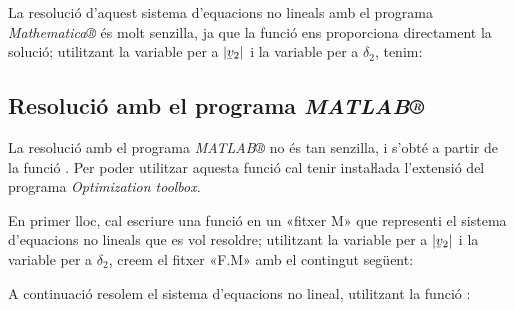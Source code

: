 La resolució d'aquest sistema d'equacions no lineals amb el programa \emph{Mathematica®} és molt senzilla, ja que la funció  ens proporciona directament la solució; utilitzant la variable  per a $|\cmplx{v}_2|$ i la variable  per a $\delta_2$, tenim:

\hspace{1cm}

\hspace{1cm}

\subsection{Resolució amb el programa \emph{MATLAB®}}

La resolució amb el programa \emph{MATLAB®} no és tan senzilla, i s'obté a partir de la funció  . Per  poder utilitzar aquesta funció cal tenir instaŀlada l'extensió del programa \textit{Optimization toolbox}.

En primer lloc, cal escriure una funció en un «fitxer M» que representi el sistema d'equacions no lineals que es vol resoldre; utilitzant la variable  per a $|\cmplx{v}_2|$ i la variable  per a $\delta_2$, creem el fitxer «F.M» amb el contingut següent:

\hspace{1cm}

\hspace{1cm}

\hspace{1cm}

A continuació resolem el sistema d'equacions no lineal, utilitzant la funció :

\hspace{1cm}

